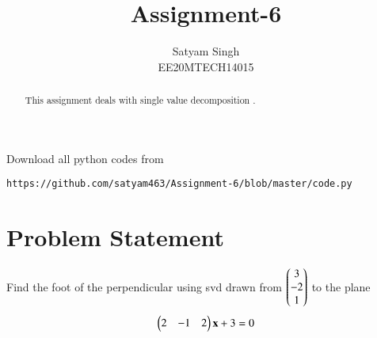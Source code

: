 \documentclass[journal,12pt,twocolumn]{IEEEtran}
\begin{document}
\renewcommand{\thefigure}{\theproblem}
\def\putbox#1#2#3{\makebox[0in][l]{\makebox[#1][l]{}\raisebox{\baselineskip}[0in][0in]{\raisebox{#2}[0in][0in]{#3}}}}
     \def\rightbox#1{\makebox[0in][r]{#1}}
     \def\centbox#1{\makebox[0in]{#1}}
     \def\topbox#1{\raisebox{-\baselineskip}[0in][0in]{#1}}
     \def\midbox#1{\raisebox{-0.5\baselineskip}[0in][0in]{#1}}
\vspace{3cm}
\title{Assignment-6}
\author{Satyam Singh \\ EE20MTECH14015}
\maketitle
\newpage
\bigskip
\renewcommand{\thefigure}{\theenumi}
\renewcommand{\thetable}{\theenumi}
\begin{abstract}
This assignment deals with single value decomposition .
\end{abstract}
Download all python codes from 
\begin{lstlisting}
https://github.com/satyam463/Assignment-6/blob/master/code.py
\end{lstlisting}
\section{Problem Statement}
 Find the foot of the perpendicular using svd drawn from $\begin{pmatrix}3\\-2\\1\end{pmatrix}$ to the plane
 \begin{align}
 \begin{pmatrix}2&-1&2\end{pmatrix}\mathbf{x}+3=0
 \end{align}
\end{document}

